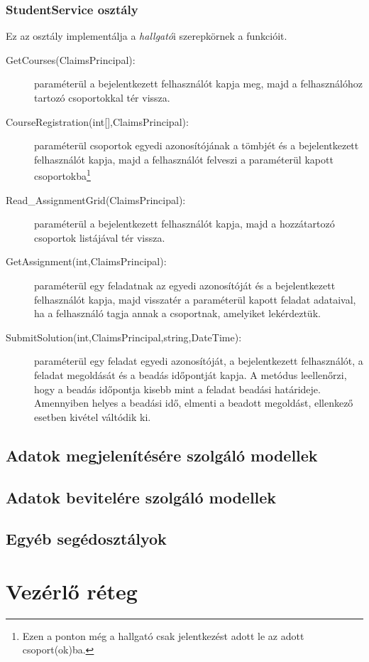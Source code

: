 \subsubsection{StudentService osztály}
Ez az osztály implementálja a \emph{hallgató}i szerepkörnek a funkcióit.
\begin{description}
	\item[GetCourses(ClaimsPrincipal):] paraméterül a bejelentkezett felhasználót kapja meg, majd a felhasználóhoz tartozó csoportokkal tér vissza.
	\item[CourseRegistration(int{[]},ClaimsPrincipal):] paraméterül csoportok egyedi azonosítójának a tömbjét és a bejelentkezett felhasználót kapja, majd a felhasználót felveszi a paraméterül kapott csoportokba\footnote{Ezen a ponton még a hallgató csak jelentkezést adott le az adott csoport(ok)ba.}
	\item[Read\_AssignmentGrid(ClaimsPrincipal):] paraméterül a bejelentkezett felhasználót kapja, majd a hozzátartozó csoportok listájával tér vissza.
	\item[GetAssignment(int,ClaimsPrincipal):] paraméterül egy feladatnak az egyedi azonosítóját és a bejelentkezett felhasználót kapja, majd visszatér a paraméterül kapott feladat adataival, ha a felhasználó tagja annak a csoportnak, amelyiket lekérdeztük.
	\item[SubmitSolution(int,ClaimsPrincipal,string,DateTime):] paraméterül egy feladat egyedi azonosítóját, a bejelentkezett felhasználót, a feladat megoldását és a beadás időpontját kapja. A metódus leellenőrzi, hogy a beadás időpontja kisebb mint a feladat beadási határideje. Amennyiben helyes a beadási idő, elmenti a beadott megoldást, ellenkező esetben kivétel váltódik ki.
\end{description}
\subsection{Adatok megjelenítésére szolgáló modellek}
\subsection{Adatok bevitelére szolgáló modellek}
\subsection{Egyéb segédosztályok}
\section{Vezérlő réteg}
\label{sec:controller}
